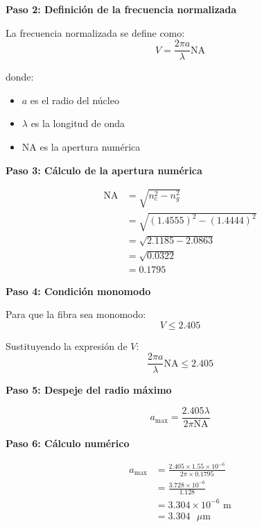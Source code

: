 \documentclass[11pt,a4paper]{article}
\begin{document}
\textbf{Paso 2: Definición de la frecuencia normalizada}

La frecuencia normalizada se define como:
\begin{equation}
    V = \frac{2\pi a}{\lambda}\text{NA}
\end{equation}

donde:
\begin{itemize}
    \item $a$ es el radio del núcleo
    \item $\lambda$ es la longitud de onda
    \item NA es la apertura numérica
\end{itemize}

\textbf{Paso 3: Cálculo de la apertura numérica}

\begin{align}
    \text{NA} &= \sqrt{n_c^2 - n_g^2} \\
    &= \sqrt{(1.4555)^2 - (1.4444)^2} \\
    &= \sqrt{2.1185 - 2.0863} \\
    &= \sqrt{0.0322} \\
    &= 0.1795
\end{align}

\textbf{Paso 4: Condición monomodo}

Para que la fibra sea monomodo:
\begin{equation}
    V \leq 2.405
\end{equation}

Sustituyendo la expresión de $V$:
\begin{equation}
    \frac{2\pi a}{\lambda}\text{NA} \leq 2.405
\end{equation}

\textbf{Paso 5: Despeje del radio máximo}

\begin{equation}
    a_{\max} = \frac{2.405 \lambda}{2\pi \text{NA}}
\end{equation}

\textbf{Paso 6: Cálculo numérico}

\begin{align}
    a_{\max} &= \frac{2.405 \times 1.55 \times 10^{-6}}{2\pi \times 0.1795} \\
    &= \frac{3.728 \times 10^{-6}}{1.128} \\
    &= 3.304 \times 10^{-6} \text{ m} \\
    &= 3.304 \text{ }\mu\text{m}
\end{align}
\end{document}
